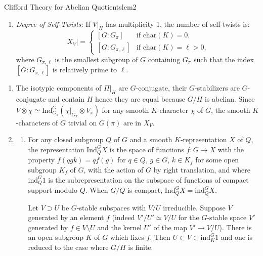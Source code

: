 \documentclass{article}
\begin{document}
\begin{lem}{Clifford Theory for Abelian Quotients}{lem2}
\begin{enumerate}
\begin{enumerate}
      \item \emph{Degree of Self-Twists:} If \(V|_H\) has multiplicity 1, the number of self-twists is:
      \[
        |X_V| = \begin{cases}
            [G:G_{\pi}] & \text{if } \mathrm{char}(K) = 0, \\
            [G:G_{\pi,\ell}] & \text{if } \mathrm{char}(K) = \ell > 0,
        \end{cases}
      \]
      where \(G_{\pi,\ell}\) is the smallest subgroup of \(G\) containing \(G_{\pi}\) such that the index \([G:G_{\pi,\ell}]\) is relatively prime to \(\ell\).
    \end{enumerate}
  \end{enumerate}
\end{lem}


\begin{Proof}
\begin{enumerate}
\item The isotypic components of \(\Pi|_H\) are \(G\)-conjugate, their \(G\)-stabilizers are \(G\)-conjugate and contain \(H\) hence they are equal because \(G/H\) is abelian. Since \(V \otimes \chi \simeq \mathrm{Ind}_{G_{\pi}}^G(\chi|_{G_{\pi}} \otimes V_{\pi})\) for any smooth \(K\)-character \(\chi\) of \(G\), the smooth \(K\)-characters of \(G\) trivial on \(G(\pi)\) are in \(X_V\).

\item
\begin{enumerate}
\item[(a)] For any closed subgroup \(Q\) of \(G\) and a smooth \(K\)-representation \(X\) of \(Q\), the representation \(\mathrm{Ind}_Q^G X\) is the space of functions \(f: G \to X\) with the property \(f(qgk) = qf(g)\) for \(q \in Q\), \(g \in G\), \(k \in K_f\) for some open subgroup \(K_f\) of \(G\), with the action of \(G\) by right translation, and where \(\mathrm{ind}_Q^G 1\) is the subrepresentation on the subspace of functions of compact support modulo \(Q\). When \(G/Q\) is compact, \(\mathrm{Ind}_Q^G X = \mathrm{ind}_Q^G X\).

Let \(V \supset U\) be \(G\)-stable subspaces with \(V/U\) irreducible. Suppose \(V\) generated by an element
\(f\) (indeed \(V'/U' \simeq V/U\) for the \(G\)-stable space \(V'\) generated by \(f \in V \setminus U\) and
the kernel \(U'\) of the map \(V' \to V/U\)). There is an open subgroup \(K\) of \(G\) which fixes \(f\). Then \(U \subset V \subset \mathrm{ind}_K^G 1\) and one is reduced to the case where \(G/H\) is finite.


\end{enumerate}
\end{enumerate}
\end{Proof}
\end{document}
